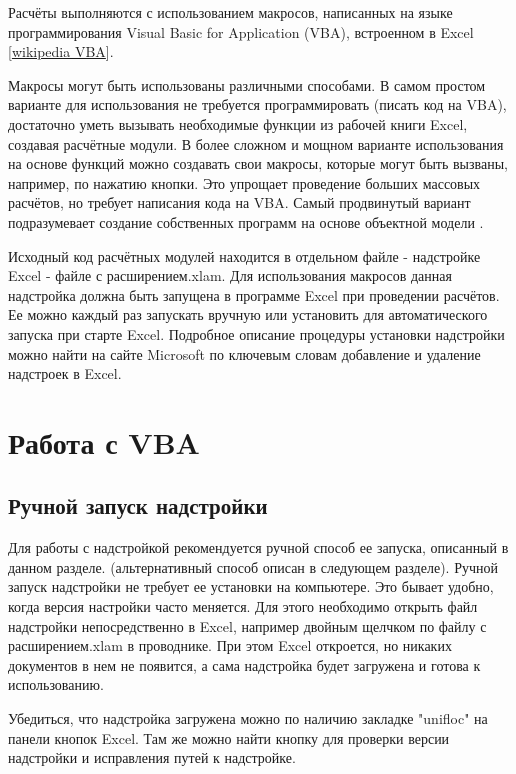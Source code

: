 Расчёты \unf{} выполняются с использованием макросов, написанных на языке программирования Visual Basic for Application (VBA), встроенном в Excel [\href{https://ru.wikipedia.org/wiki/Visual_Basic_for_Applications}{wikipedia VBA}]. 

Макросы \unf{} могут быть использованы различными способами. В самом простом варианте для использования \unf{} не требуется программировать (писать код на VBA), достаточно уметь вызывать необходимые функции из рабочей книги Excel, создавая расчётные модули. В более сложном и мощном варианте использования на основе функций \unf{} можно создавать свои макросы, которые могут быть вызваны, например, по нажатию кнопки. Это упрощает проведение больших массовых расчётов, но требует написания кода на VBA. Самый продвинутый вариант подразумевает создание собственных программ на основе объектной модели \unf{}. 


Исходный код расчётных модулей находится в отдельном файле - надстройке Excel - файле с расширением.xlam. Для использования макросов данная надстройка должна быть запущена в программе Excel при проведении расчётов. Ее можно каждый раз запускать вручную или установить для автоматического запуска при старте Excel. Подробное описание процедуры установки надстройки можно найти на сайте Microsoft по ключевым словам 
добавление и удаление надстроек в Excel.

\section{Работа с VBA}


\subsection{Ручной запуск надстройки}
Для работы с надстройкой рекомендуется ручной способ ее запуска, описанный в данном разделе. (альтернативный способ описан в следующем разделе).
Ручной запуск надстройки не требует ее установки на компьютере. Это бывает удобно, когда версия настройки часто меняется. Для этого необходимо открыть файл надстройки непосредственно в Excel, например двойным щелчком по файлу с расширением.xlam в проводнике. При этом Excel откроется, но никаких документов в нем не появится, а сама надстройка будет загружена и готова к использованию. 

Убедиться, что надстройка загружена можно по наличию закладке "unifloc" на панели кнопок Excel. Там же можно найти кнопку для проверки версии надстройки и исправления путей к надстройке. 

